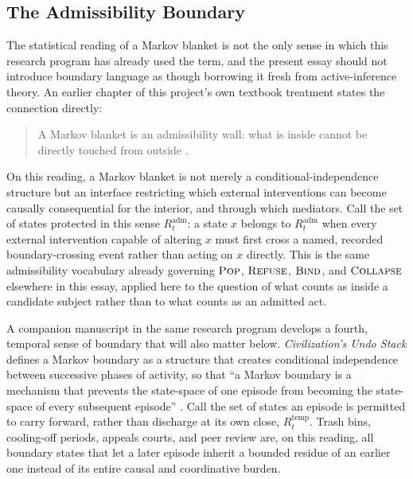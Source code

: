 \documentclass[11pt]{article}
\newcommand{\Pop}{\textsc{Pop}}
\newcommand{\Refuse}{\textsc{Refuse}}
\newcommand{\Bind}{\textsc{Bind}}
\newcommand{\Collapse}{\textsc{Collapse}}
\begin{document}
\subsection{The Admissibility Boundary}
\label{sec:admissibility}

The statistical reading of a Markov blanket is not the only sense in which this research program has already used the term, and the present essay should not introduce boundary language as though borrowing it fresh from active-inference theory. An earlier chapter of this project's own textbook treatment states the connection directly:

\begin{quote}
A Markov blanket is an admissibility wall: what is inside cannot be directly touched from outside \cite{flyxionCPR}.
\end{quote}

\noindent On this reading, a Markov blanket is not merely a conditional-independence structure but an interface restricting which external interventions can become causally consequential for the interior, and through which mediators. Call the set of states protected in this sense $R^{\mathrm{adm}}_t$: a state $x$ belongs to $R^{\mathrm{adm}}_t$ when every external intervention capable of altering $x$ must first cross a named, recorded boundary-crossing event rather than acting on $x$ directly. This is the same admissibility vocabulary already governing $\Pop$, $\Refuse$, $\Bind$, and $\Collapse$ elsewhere in this essay, applied here to the question of what counts as inside a candidate subject rather than to what counts as an admitted act.

A companion manuscript in the same research program develops a fourth, temporal sense of boundary that will also matter below. \emph{Civilization's Undo Stack} defines a Markov boundary as a structure that creates conditional independence between successive phases of activity, so that ``a Markov boundary is a mechanism that prevents the state-space of one episode from becoming the state-space of every subsequent episode'' \cite{flyxionUndoStack}. Call the set of states an episode is permitted to carry forward, rather than discharge at its own close, $R^{\mathrm{temp}}_t$. Trash bins, cooling-off periods, appeals courts, and peer review are, on this reading, all boundary states that let a later episode inherit a bounded residue of an earlier one instead of its entire causal and coordinative burden.
\end{document}
